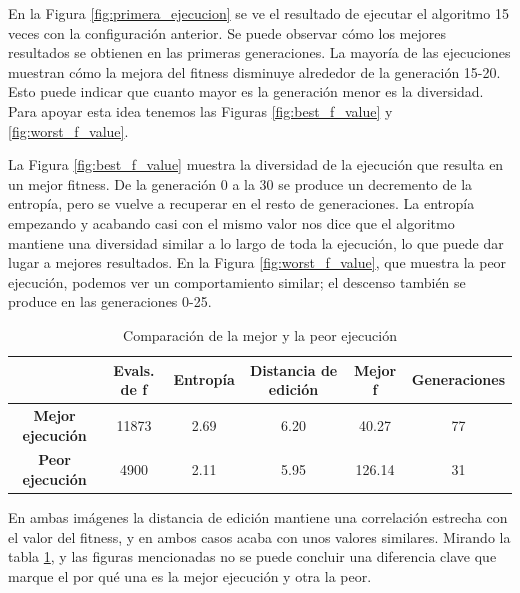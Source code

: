 En la Figura \ref{fig:primera_ejecucion} se ve el resultado de ejecutar el algoritmo 15 veces con la configuración anterior.
Se puede observar cómo los mejores resultados se obtienen en las primeras generaciones. La mayoría de las ejecuciones muestran cómo la mejora
del fitness disminuye alrededor de la generación 15-20. Esto puede indicar que cuanto mayor es la generación menor es la diversidad. 
Para apoyar esta idea tenemos las Figuras \ref{fig:best_f_value} y \ref{fig:worst_f_value}. 

La Figura \ref{fig:best_f_value} muestra la diversidad de la ejecución que resulta en un mejor fitness. De la generación 0 a la 30 se produce un decremento de la entropía,
pero se vuelve a recuperar en el resto de generaciones. La entropía empezando y acabando casi con el mismo valor nos dice que el algoritmo mantiene una diversidad similar a 
lo largo de toda la ejecución, lo que puede dar lugar a mejores resultados. En la Figura \ref{fig:worst_f_value}, que muestra la peor ejecución, podemos 
ver un comportamiento similar; el descenso también se produce en las generaciones 0-25. 

\begin{table}[]
    \begin{tabular}{||c|c|c|c|c|c||}
    \hline
                             & \textbf{Evals. de f} & \textbf{Entropía} & \textbf{Distancia de edición} & \textbf{Mejor f} & \textbf{Generaciones} \\ \hline
    \textbf{Mejor ejecución} & 11873                      & 2.69              & 6.20                          & 40.27                     & 77                    \\ \hline
    \textbf{Peor ejecución}  & 4900                       & 2.11              & 5.95                          & 126.14                    & 31                    \\ \hline
    \end{tabular}
    \caption{Comparación de la mejor y la peor ejecución}
    \label{fig:Comparación}
\end{table}

En ambas imágenes la distancia de edición mantiene una correlación estrecha con el valor del fitness, y en ambos casos acaba con unos valores similares. Mirando la tabla \ref{fig:Comparación}, y las figuras
mencionadas no se puede concluir una diferencia clave que marque el por qué una es la mejor ejecución y otra la peor.

